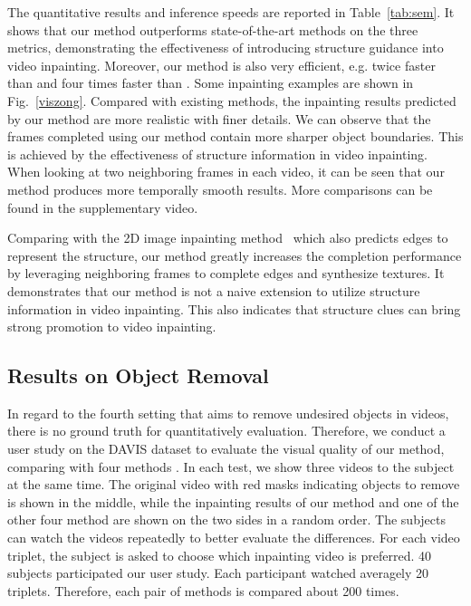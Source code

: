 The quantitative results and inference speeds are reported in Table~\ref{tab:sem}.
It shows that our method outperforms state-of-the-art methods on the three metrics, demonstrating the effectiveness of introducing structure guidance into video inpainting.
Moreover, our method is also very efficient, e.g. twice faster than \cite{Kim_2019_CVPR1} and four times faster than \cite{Xu_2019_CVPR}. 
%
Some inpainting examples are shown in Fig.~\ref{viszong}.
Compared with existing methods, the inpainting results predicted by our method are more realistic with finer details. 
We can observe that the frames completed using our method contain more sharper object boundaries. This is achieved by the effectiveness of structure information in video inpainting.
%
When looking at two neighboring frames in each video, it can be seen that our method produces more temporally smooth results. More comparisons can be found in the supplementary video.




Comparing with the 2D image inpainting method~\cite{nazeri2019edgeconnect} which also predicts edges to represent the structure, our method greatly increases the completion performance by leveraging neighboring frames to complete edges and synthesize textures. 
%
It demonstrates that our method is not a naive extension to utilize structure information in video inpainting.
This also indicates that structure clues can bring strong promotion to video inpainting.


 

%





\subsection{Results on Object Removal}


In regard to the fourth setting that aims to remove undesired objects in videos, there is no ground truth for quantitatively evaluation. Therefore,
we conduct a user study on the DAVIS dataset to evaluate the visual quality of our method, comparing with four methods \cite{nazeri2019edgeconnect,wang2019video,Kim_2019_CVPR1,Xu_2019_CVPR}.
%
In each test, we show three videos to the subject at the same time. The original video with red masks indicating objects to remove is shown in the middle, while the inpainting results of our method and one of the other four method are shown on the two sides in a random order.
%  
The subjects can watch the videos repeatedly to better evaluate the differences.
For each video triplet, the subject is asked to choose which inpainting video is preferred.
40 subjects participated our user study. 
Each participant watched averagely 20 triplets. 
Therefore, each pair of methods is compared about 200 times.

